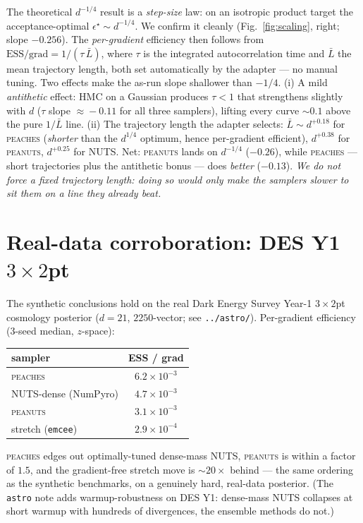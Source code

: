 \documentclass[11pt]{article}
\begin{document}
The theoretical $d^{-1/4}$ result is a \emph{step-size} law: on an isotropic
product target the acceptance-optimal $\epsilon^\star\!\sim\!d^{-1/4}$. We
confirm it cleanly (Fig.~\ref{fig:scaling}, right; slope $-0.256$). The
\emph{per-gradient} efficiency then follows from
$\text{ESS}/\text{grad}=1/(\tau\,\bar L)$, where $\tau$ is the integrated
autocorrelation time and $\bar L$ the mean trajectory length, both set
automatically by the adapter --- no manual tuning. Two effects make the
as-run slope shallower than $-1/4$. (i) A mild \emph{antithetic} effect:
HMC on a Gaussian produces $\tau\!<\!1$ that strengthens slightly with $d$
($\tau$ slope $\approx\!-0.11$ for all three samplers), lifting every curve
$\sim\!0.1$ above the pure $1/\bar L$ line. (ii) The trajectory length the
adapter selects: $\bar L\!\sim\!d^{+0.18}$ for \textsc{peaches} (\emph{shorter}
than the $d^{1/4}$ optimum, hence per-gradient efficient), $d^{+0.38}$ for
\textsc{peanuts}, $d^{+0.25}$ for NUTS. Net: \textsc{peanuts} lands on
$d^{-1/4}$ ($-0.26$), while \textsc{peaches} --- short trajectories plus the
antithetic bonus --- does \emph{better} ($-0.13$). \emph{We do not force a
fixed trajectory length: doing so would only make the samplers slower to sit
them on a line they already beat.}

\section{Real-data corroboration: DES Y1 $3\times2$pt}

The synthetic conclusions hold on the real Dark Energy Survey Year-1
$3\times2$pt cosmology posterior ($d{=}21$, $2250$-vector; see
\texttt{../astro/}). Per-gradient efficiency (3-seed median, $z$-space):
\begin{center}\small
\begin{tabular}{l c}
\toprule
sampler & ESS / grad\\
\midrule
\textsc{peaches}           & $6.2\times10^{-3}$\\
NUTS-dense (NumPyro)       & $4.7\times10^{-3}$\\
\textsc{peanuts}           & $3.1\times10^{-3}$\\
stretch (\texttt{emcee})   & $2.9\times10^{-4}$\\
\bottomrule
\end{tabular}
\end{center}
\textsc{peaches} edges out optimally-tuned dense-mass NUTS, \textsc{peanuts}
is within a factor of $1.5$, and the gradient-free stretch move is
$\sim\!20\times$ behind --- the same ordering as the synthetic benchmarks,
on a genuinely hard, real-data posterior. (The \texttt{astro} note adds
warmup-robustness on DES Y1: dense-mass NUTS collapses at short warmup with
hundreds of divergences, the ensemble methods do not.)
\end{document}
